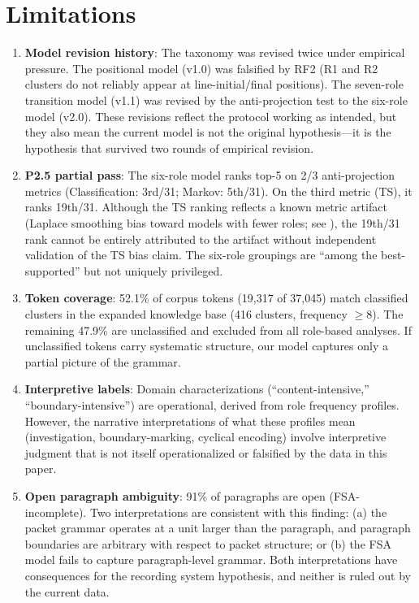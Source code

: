 \documentclass[11pt,a4paper,twocolumn]{article}
\begin{document}
\section{Limitations}
\label{sec:limitations}

\begin{enumerate}[leftmargin=*,itemsep=2pt]

    \item \textbf{Model revision history}: The taxonomy was revised twice under empirical pressure. The positional model (v1.0) was falsified by RF2 (R1 and R2 clusters do not reliably appear at line-initial/final positions). The seven-role transition model (v1.1) was revised by the anti-projection test to the six-role model (v2.0). These revisions reflect the protocol working as intended, but they also mean the current model is not the original hypothesis---it is the hypothesis that survived two rounds of empirical revision.

    \item \textbf{P2.5 partial pass}: The six-role model ranks top-5 on 2/3 anti-projection metrics (Classification: 3rd/31; Markov: 5th/31). On the third metric (TS), it ranks 19th/31. Although the TS ranking reflects a known metric artifact (Laplace smoothing bias toward models with fewer roles; see ), the 19th/31 rank cannot be entirely attributed to the artifact without independent validation of the TS bias claim. The six-role groupings are ``among the best-supported'' but not uniquely privileged.

    \item \textbf{Token coverage}: 52.1\% of corpus tokens (19,317 of 37,045) match classified clusters in the expanded knowledge base (416 clusters, frequency $\geq$8). The remaining 47.9\% are unclassified and excluded from all role-based analyses. If unclassified tokens carry systematic structure, our model captures only a partial picture of the grammar.

    \item \textbf{Interpretive labels}: Domain characterizations (``content-intensive,'' ``boundary-intensive'') are operational, derived from role frequency profiles. However, the narrative interpretations of what these profiles mean (investigation, boundary-marking, cyclical encoding) involve interpretive judgment that is not itself operationalized or falsified by the data in this paper.

    \item \textbf{Open paragraph ambiguity}: 91\% of paragraphs are open (FSA-incomplete). Two interpretations are consistent with this finding: (a) the packet grammar operates at a unit larger than the paragraph, and paragraph boundaries are arbitrary with respect to packet structure; or (b) the FSA model fails to capture paragraph-level grammar. Both interpretations have consequences for the recording system hypothesis, and neither is ruled out by the current data.


\end{enumerate}
\end{document}
